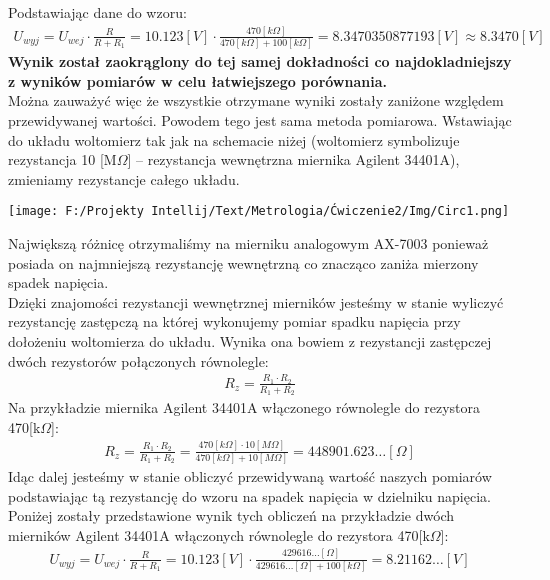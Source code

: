 \documentclass[11pt]{article}
\begin{document}
    \noindent Podstawiając dane do wzoru:
    \begin{gather*}
        U_{wyj}=U_{wej}\cdot \frac{R}{R+R_1}=10.123[V]\cdot\frac{470[k\Omega]}{470[k\Omega]+100[k\Omega]}=8.3470350877193[V]\approx 8.3470[V]
    \end{gather*}
    {\tiny\textbf{Wynik został zaokrąglony do tej samej dokładności co najdokladniejszy z wyników pomiarów w celu łatwiejszego porównania.}}\\
    \indent Można zauważyć więc że wszystkie otrzymane wyniki zostały zaniżone
    względem przewidywanej wartości. Powodem tego jest sama metoda pomiarowa.
    Wstawiając do układu woltomierz tak jak na schemacie niżej (woltomierz symbolizuje
    rezystancja 10 [M$\Omega$] – rezystancja wewnętrzna miernika Agilent 34401A),
    zmieniamy rezystancje całego układu.
    \begin{center}
        \texttt{[image: F:/Projekty Intellij/Text/Metrologia/Ćwiczenie2/Img/Circ1.png]}
    \end{center}
    Największą różnicę otrzymaliśmy na mierniku analogowym AX-7003 ponieważ posiada on
    najmniejszą rezystancję wewnętrzną co znacząco zaniża mierzony spadek napięcia.\\
    Dzięki znajomości rezystancji wewnętrznej mierników jesteśmy w stanie wyliczyć
    rezystancję zastępczą na której wykonujemy pomiar spadku napięcia przy dołożeniu woltomierza do układu.
    Wynika ona bowiem z rezystancji zastępczej dwóch rezystorów połączonych równolegle:
    \begin{gather*}
        R_z=\frac{R_1\cdot R_2}{R_1+R_2}
    \end{gather*}
    Na przykładzie miernika Agilent 34401A włączonego równolegle do rezystora 470[k$\Omega$]:
    \begin{gather*}
        R_z=\frac{R_1\cdot R_2}{R_1+R_2}=\frac{470[k\Omega] \cdot 10[M\Omega]}{470[k\Omega]+10[M\Omega]}=448901.623\dots [\Omega]
    \end{gather*}
    \indent Idąc dalej jesteśmy w stanie obliczyć przewidywaną wartość naszych pomiarów podstawiając
    tą rezystancję do wzoru na spadek napięcia w dzielniku napięcia. Poniżej zostały przedstawione
    wynik tych obliczeń na przykładzie dwóch mierników Agilent 34401A włączonych równolegle do rezystora 470[k$\Omega$]:
    \begin{gather*}
        U_{wyj}=U_{wej}\cdot \frac{R}{R+R_1}=10.123[V]\cdot \frac{429616\dots[\Omega]}{429616\dots[\Omega]+100[k\Omega]}=8.21162\dots[V]
    \end{gather*}
\end{document}
